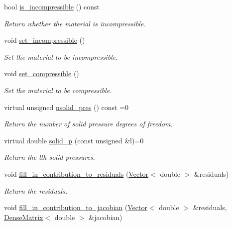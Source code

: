 \begin{DoxyCompactItemize}
bool \hyperlink{classoomph_1_1AxisymmetricPVDEquationsWithPressure_a7d38dd422ad492ad99bda7abac207738}{is\+\_\+incompressible} () const
\begin{DoxyCompactList}\small\item\em Return whether the material is incompressible. \end{DoxyCompactList}\item 
void \hyperlink{classoomph_1_1AxisymmetricPVDEquationsWithPressure_a731e0c99343554529ab5e41bad4a454d}{set\+\_\+incompressible} ()
\begin{DoxyCompactList}\small\item\em Set the material to be incompressible. \end{DoxyCompactList}\item 
void \hyperlink{classoomph_1_1AxisymmetricPVDEquationsWithPressure_af9c2a4524a6de7ce842a6fc0c3c810e9}{set\+\_\+compressible} ()
\begin{DoxyCompactList}\small\item\em Set the material to be compressible. \end{DoxyCompactList}\item 
virtual unsigned \hyperlink{classoomph_1_1AxisymmetricPVDEquationsWithPressure_a4cfeab9fe5e9c26fcf39659bacc53a8f}{nsolid\+\_\+pres} () const =0
\begin{DoxyCompactList}\small\item\em Return the number of solid pressure degrees of freedom. \end{DoxyCompactList}\item 
virtual double \hyperlink{classoomph_1_1AxisymmetricPVDEquationsWithPressure_aeb03a2cef37040790d5d9dacafb89144}{solid\+\_\+p} (const unsigned \&l)=0
\begin{DoxyCompactList}\small\item\em Return the lth solid pressures. \end{DoxyCompactList}\item 
void \hyperlink{classoomph_1_1AxisymmetricPVDEquationsWithPressure_a97e21b6429e7406a463d8c8cf3057660}{fill\+\_\+in\+\_\+contribution\+\_\+to\+\_\+residuals} (\hyperlink{classoomph_1_1Vector}{Vector}$<$ double $>$ \&residuals)
\begin{DoxyCompactList}\small\item\em Return the residuals. \end{DoxyCompactList}\item 
void \hyperlink{classoomph_1_1AxisymmetricPVDEquationsWithPressure_a43c81b1695c9cd22b7546dd7764b70bd}{fill\+\_\+in\+\_\+contribution\+\_\+to\+\_\+jacobian} (\hyperlink{classoomph_1_1Vector}{Vector}$<$ double $>$ \&residuals, \hyperlink{classoomph_1_1DenseMatrix}{Dense\+Matrix}$<$ double $>$ \&jacobian)

\end{DoxyCompactItemize}
